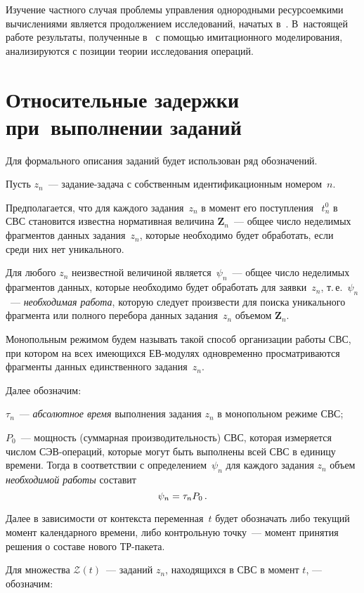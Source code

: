 \begin{multicols}{2}
Изучение частного случая проб\-ле\-мы управ\-ле\-ния однородными
ресурсоемкими вычислениями является продолжением исследований,
начатых в~\cite{Gol10}. В~настоящей работе результаты, полученные 
в~\cite{Prep11, Gol12} с помощью имитационного моделирования,
анализируются с позиции теории исследования операций.

\section{Относительные задержки при~выполнении заданий}

Для формального описания заданий будет использован ряд обозначений.

Пусть $z_{n}$~--- задание-задача с собственным идентификационным номером~$n$.

Предполагается, что для каждого задания~$z_n$ в момент его
поступления~ $t_n^0$ в СВС становится известна нормативная величина
$\textbf{Z}_{n}$~---  общее число  неделимых фрагментов данных
задания~$z_{n}$, которые необходимо будет обработать, если среди
них нет уникального.

Для любого $z_n$ неизвестной величиной является~$\psi_{n}$~--- общее
число неделимых фрагментов данных, которые  необходимо будет
обработать для заявки~$z_{n}$,  т.\,е.\ $\psi_{n}$~---
\textit{необходимая работа}, которую следует произвести для поиска
уникального фрагмента или полного перебора данных задания~$z_{n}$
объемом $\textbf{Z}_{n}$.

Монопольным режимом будем называть такой способ организации работы
СВС, при котором на  всех имеющихся ЕВ-мо\-ду\-лях одновременно
просматриваются фрагменты данных единственного задания~$z_n$.

Далее обозначим:

$\tau_n$~--- \textit{абсолютное время } выполнения задания $z_n$ в монопольном режиме СВС;

$P_0$~--- мощность (суммарная производительность) СВС, которая
измеряется  числом СЭВ-опе\-ра\-ций, которые могут быть выполнены всей
СВС в единицу времени. Тогда   в соответствии с определением~$\psi_n$ 
для каждого задания  $z_n$ объем \textit{необходимой работы} составит
$$
\psi_n \hm   =   \tau_n P_0\,.
$$

Далее в зависимости от контекста  переменная~$t$ будет обозначать
либо текущий момент календарного времени, либо контрольную точку~---
момент принятия решения о составе нового ТР-па\-ке\-та.

Для множества $\mathcal{Z}(t)$~---  заданий $z_n$, находящихся в СВС в момент $t$, --- обозначим:


\end{multicols}
